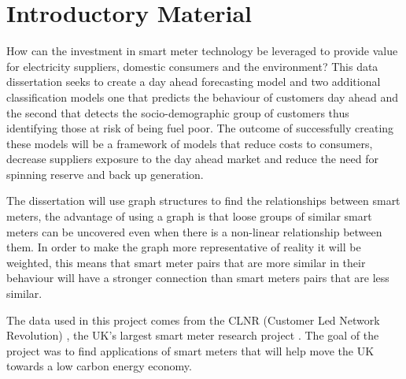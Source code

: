 \chapter{Introductory Material}
\label{Intro}

How can the investment in smart meter technology be leveraged to provide value for electricity suppliers, domestic consumers and the environment? This data dissertation seeks to create a day ahead forecasting model and two additional classification models one that predicts the behaviour of customers day ahead and the second that detects the socio-demographic group of customers thus identifying those at risk of being fuel poor. The outcome of successfully creating these models will be a framework of models that reduce costs to consumers, decrease suppliers exposure to the day ahead market and reduce the need for spinning reserve and back up generation.

The dissertation will use graph structures to find the relationships between smart meters, the advantage of using a graph is that loose groups of similar smart meters can be uncovered even when there is a non-linear relationship between them. In order to make the graph more representative of reality it will be weighted, this means that smart meter pairs that are more similar in their behaviour will have a stronger connection than smart meters pairs that are less similar.

The data used in this project comes from the CLNR (Customer Led Network Revolution) \cite{customerlednetworkrevolution}, the UK's largest smart meter research project \cite{durhamenergyinstitutecustomerlednetworkrevolutiondurhamuniversity}. The goal of the project was to find applications of smart meters that will help move the UK towards a low carbon energy economy.

